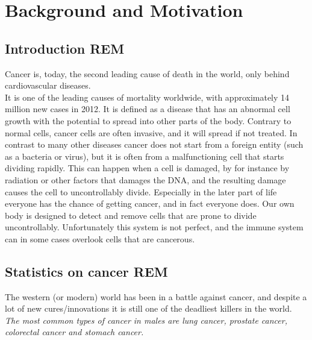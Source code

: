 \section{Background and Motivation}
  \subsection{Introduction REM}
    Cancer is, today, the second leading cause of death in the world, only behind cardiovascular diseases.\\  %
    It is one of the leading causes of mortality worldwide, with approximately 14 million new cases in 2012. %
    It is defined as a disease that has an abnormal cell growth with the potential to spread into other parts of the body.%
    Contrary to normal cells, cancer cells are often invasive, and it will spread if not treated. 
    In contrast to many other diseases cancer does not start from a foreign entity (such as a bacteria or virus), but it is often from a malfunctioning cell that starts dividing rapidly. 
    This can happen when a cell is damaged, by for instance by radiation or other factors that damages the DNA, and the resulting damage causes the cell to uncontrollably divide. 
    Especially in the later part of life everyone has the chance of getting cancer, and in fact everyone does. Our own body is designed to detect and remove cells that are prone
    to divide uncontrollably. Unfortunately this system is not perfect, and the immune system can in some cases overlook cells that are cancerous.
	
    \vspace{10px}
	
  \subsection{Statistics on cancer REM}
    The western (or modern) world has been in a battle against cancer, and despite a 
    lot of new cures/innovations it is still one of the deadliest killers in the world. 
    \textit{The most common types of cancer in males are lung cancer, prostate cancer, colorectal cancer and stomach cancer.\cite{stewart2014world}}
    
    \vspace{10px}
    
